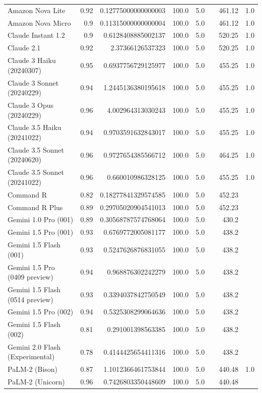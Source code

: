 \begin{table}[htp]
{\begin{tabular}{lrrrrrrr}
Amazon Nova Lite & 0.92 & 0.12775000000000003 & 100.0 & 5.0 &  & 461.12 & 1.0 \\
Amazon Nova Micro & 0.9 & 0.11315000000000004 & 100.0 & 5.0 &  & 461.12 & 1.0 \\
Claude Instant 1.2 & 0.9 & 0.6128408885002137 & 100.0 & 5.0 &  & 520.25 & 1.0 \\
Claude 2.1 & 0.92 & 2.37366126537323 & 100.0 & 5.0 &  & 520.25 & 1.0 \\
Claude 3 Haiku (20240307) & 0.95 & 0.6937756729125977 & 100.0 & 5.0 &  & 455.25 & 1.0 \\
Claude 3 Sonnet (20240229) & 0.94 & 1.2445136380195618 & 100.0 & 5.0 &  & 455.25 & 1.0 \\
Claude 3 Opus (20240229) & 0.96 & 4.002964313030243 & 100.0 & 5.0 &  & 455.25 & 1.0 \\
Claude 3.5 Haiku (20241022) & 0.94 & 0.9703591632843017 & 100.0 & 5.0 &  & 455.25 & 1.0 \\
Claude 3.5 Sonnet (20240620) & 0.96 & 0.9727654385566712 & 100.0 & 5.0 &  & 464.25 & 1.0 \\
Claude 3.5 Sonnet (20241022) & 0.96 & 0.660010986328125 & 100.0 & 5.0 &  & 455.25 & 1.0 \\
Command R & 0.82 & 0.18277841329574585 & 100.0 & 5.0 &  & 452.23 &  \\
Command R Plus & 0.89 & 0.29705020904541013 & 100.0 & 5.0 &  & 452.23 &  \\
Gemini 1.0 Pro (001) & 0.89 & 0.30568787574768064 & 100.0 & 5.0 &  & 430.2 &  \\
Gemini 1.5 Pro (001) & 0.93 & 0.6769772005081177 & 100.0 & 5.0 &  & 438.2 &  \\
Gemini 1.5 Flash (001) & 0.93 & 0.5247626876831055 & 100.0 & 5.0 &  & 438.2 &  \\
Gemini 1.5 Pro (0409 preview) & 0.94 & 0.968876302242279 & 100.0 & 5.0 &  & 438.2 &  \\
Gemini 1.5 Flash (0514 preview) & 0.93 & 0.3394037842750549 & 100.0 & 5.0 &  & 438.2 &  \\
Gemini 1.5 Pro (002) & 0.94 & 0.5325308299064636 & 100.0 & 5.0 &  & 438.2 &  \\
Gemini 1.5 Flash (002) & 0.81 & 0.291001398563385 & 100.0 & 5.0 &  & 438.2 &  \\
Gemini 2.0 Flash (Experimental) & 0.78 & 0.4144425654411316 & 100.0 & 5.0 &  & 438.2 &  \\
PaLM-2 (Bison) & 0.87 & 1.1012366461753844 & 100.0 & 5.0 &  & 440.48 & 1.0 \\
PaLM-2 (Unicorn) & 0.96 & 0.7426803350448609 & 100.0 & 5.0 &  & 440.48 &  \\

\end{tabular}}
\end{table}
